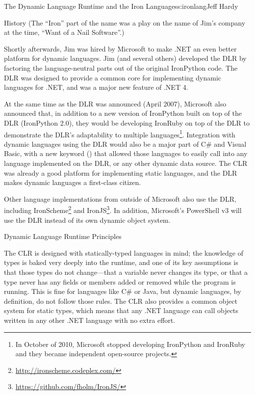 \begin{aosachapter}{The Dynamic Language Runtime and the Iron Languages}{s:ironlang}{Jeff Hardy}
\begin{aosasect1}{History}
\noindent
(The ``Iron'' part of the name was a play on the name of Jim's company at the
time, ``Want of a Nail Software''.)

Shortly afterwards, Jim was hired by Microsoft to make .NET an even better
platform for dynamic languages. Jim (and several others) developed the DLR by
factoring the language-neutral parts out of the original IronPython code. The
DLR was designed to provide a common core for implementing dynamic languages
for .NET, and was a major new feature of .NET 4.

At the same time as the DLR was announced (April 2007), Microsoft also
announced that, in addition to a new version of IronPython built on top of the
DLR (IronPython 2.0), they would be developing IronRuby on top of the DLR
to demonstrate the DLR's adaptability to multiple languages\footnote{In October
of 2010, Microsoft stopped developing IronPython and IronRuby and they became
independent open-source projects.}. Integration with dynamic languages using
the DLR would also be a major part of C\# and Visual Basic, with a new keyword
() that allowed those languages to easily call into any language
implemented on the DLR, or any other dynamic data source. The CLR was already a
good platform for implementing static languages, and the DLR makes dynamic
languages a first-class citizen.

Other language implementations from outside of Microsoft also use the DLR,
including IronScheme\footnote{\url{http://ironscheme.codeplex.com/}} and
IronJS\footnote{\url{https://github.com/fholm/IronJS/}}. In addition,
Microsoft's PowerShell v3 will use the DLR instead of its own dynamic object
system.

\end{aosasect1}

\begin{aosasect1}{Dynamic Language Runtime Principles}

The CLR is designed with statically-typed languages in mind; the knowledge of
types is baked very deeply into the runtime, and one of its key assumptions is
that those types do not change---that a variable never changes its type, or
that a type never has any fields or members added or removed while the program
is running. This is fine for languages like C\# or Java, but dynamic languages,
by definition, do not follow those rules. The CLR also provides a common object
system for static types, which means that any .NET language can call objects
written in any other .NET language with no extra effort.


\end{aosasect1}
\end{aosachapter}
